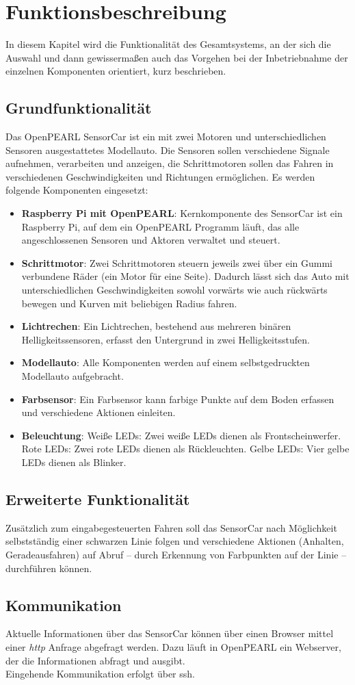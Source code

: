 \chapter{Funktionsbeschreibung}
\label{funktionsbeschreibung}

In diesem Kapitel wird die Funktionalität des Gesamtsystems, an der sich die Auswahl und dann gewissermaßen auch das Vorgehen bei der Inbetriebnahme der einzelnen Komponenten orientiert, kurz beschrieben.

\section{Grundfunktionalität}
Das OpenPEARL SensorCar ist ein mit zwei Motoren und unterschiedlichen Sensoren ausgestattetes Modellauto. Die Sensoren sollen verschiedene Signale aufnehmen, verarbeiten und anzeigen, die Schrittmotoren sollen das Fahren in verschiedenen Geschwindigkeiten und Richtungen ermöglichen.
Es werden folgende Komponenten eingesetzt:\\

\begin{itemize}
	\item \textbf{Raspberry Pi mit OpenPEARL}: Kernkomponente des SensorCar ist ein Raspberry Pi, auf dem ein OpenPEARL Programm läuft, das alle angeschlossenen Sensoren und Aktoren verwaltet und steuert.
	\item \textbf{Schrittmotor}: Zwei Schrittmotoren steuern jeweils zwei über ein Gummi verbundene Räder (ein Motor für eine Seite). Dadurch lässt sich das Auto mit unterschiedlichen Geschwindigkeiten sowohl vorwärts wie auch rückwärts bewegen und Kurven mit beliebigen Radius fahren.
	\item \textbf{Lichtrechen}: Ein Lichtrechen, bestehend aus mehreren binären Helligkeitssensoren, erfasst den Untergrund in zwei Helligkeitsstufen. 
	\item \textbf{Modellauto}: Alle Komponenten werden auf einem selbstgedruckten Modellauto aufgebracht.
	\item \textbf{Farbsensor}: Ein Farbsensor kann farbige Punkte auf dem Boden erfassen und verschiedene Aktionen einleiten.
	\item \textbf{Beleuchtung}:
		\subitem Weiße LEDs: Zwei weiße LEDs dienen als Frontscheinwerfer.
		\subitem Rote LEDs: Zwei rote LEDs dienen als Rückleuchten.
		\subitem Gelbe LEDs: Vier gelbe LEDs dienen als Blinker.
\end{itemize}

\section{Erweiterte Funktionalität}
Zusätzlich zum eingabegesteuerten Fahren soll das SensorCar nach Möglichkeit selbstständig einer schwarzen Linie folgen und verschiedene Aktionen (Anhalten, Geradeausfahren) auf Abruf -- durch Erkennung von Farbpunkten auf der Linie -- durchführen können.

\section{Kommunikation}
Aktuelle Informationen über das SensorCar können über einen Browser mittel einer \emph{http} Anfrage abgefragt werden. Dazu läuft in OpenPEARL ein Webserver, der die Informationen abfragt und ausgibt.\\
Eingehende Kommunikation erfolgt über ssh.




